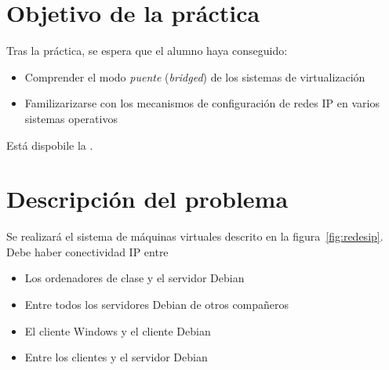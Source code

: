 
\usepackage{eurosym}
\usepackage{needspace}




\renewcommand{\hmwkTitle}{Práctica red IP}
\renewcommand{\hmwkClass}{Planificación y Administración de Redes}

\usepackage{blindtext}






\primerapagina

\setlength{\parindent}{1em}
\setlength{\parskip}{1em}

\section{Objetivo de la práctica}
Tras la práctica, se espera que el alumno haya conseguido:
\begin{itemize}
\item Comprender el modo \textit{puente} (\textit{bridged}) de los sistemas de virtualización
\item Familizarizarse con los  mecanismos de configuración de redes IP en varios sistemas operativos
\end{itemize}

Está dispobile la .



\section{Descripción del problema}
Se realizará el sistema de máquinas virtuales descrito en la figura~\ref{fig:redesip}. Debe haber conectividad IP entre
\begin{itemize}
\item Los ordenadores de clase y el servidor Debian
\item Entre todos los servidores Debian de otros compañeros
\item El cliente Windows y el cliente Debian
\item Entre los clientes y el servidor Debian
\end{itemize}

